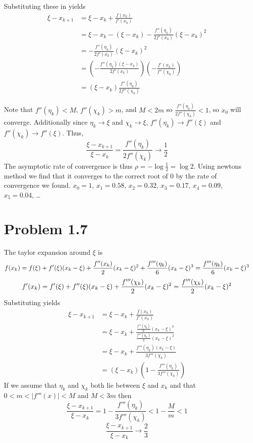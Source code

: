 \documentclass{article}
\begin{document}
Substituting these in yields
\begin{align*}
	\xi - x_{k+1} &= \xi - x_k + \frac{f(x_k)}{f'(x_k)} \\
	&= \xi - x_k - (\xi-x_k)  - \frac{f''(\eta_k)}{2f'(x_k)}(\xi-x_k)^2 \\
	&= -\frac{f''(\eta_k)}{2f'(x_k)}(\xi-x_k)^2 \\
	&=  \left(-\frac{f''(\eta_k)(\xi-x_k)}{2f'(x_k)}\right)\left(-\frac{f'(x_k)}{f''(\chi_k)}\right)\\
	&= (\xi-x_k)\frac{f''(\eta_k)}{2f''(\chi_k)}
\end{align*}

Note that $f''(\eta_k) < M$, $f''(\chi_k) > m$, and $M < 2m$ so $\frac{f''(\eta_k)}{2f''(\chi_k)} < 1$,
so $x_0$ will converge.
Additionally since $\eta_k \to \xi$ and $\chi_k \to \xi$,
$f''(\eta_k) \to f''(\xi)$ and $f''(\chi_k) \to f''(\xi)$.
Thus,
\[
	\frac{\xi - x_{k+1}}{\xi - x_k} = \frac{f''(\eta_k)}{2f''(\chi_k)} \to \frac{1}{2}
\]
The asymptotic rate of convergence is thus $\rho = -\log \frac{1}{2} = \log 2$.
Using newtons method we find that it converges to the correct root of 0 by the rate of convergence we found.
$x_0 = 1$, $x_1 = 0.58$, $x_2 = 0.32$, $x_3 = 0.17$, $x_4 = 0.09$, $x_5 = 0.04$, \dots
\newpage 

\section*{Problem 1.7}

The taylor expansion around $\xi$ is 
\[
	f(x_k) = f(\xi) + f'(\xi)(x_k-\xi) + \frac{f''(x_k)}{2}(x_k-\xi)^2 + \frac{f'''(\eta_k)}{6}(x_k-\xi)^3 = \frac{f'''(\eta_k)}{6}(x_k-\xi)^3\\
\]
\[
	f'(x_k) = f'(\xi) + f''(\xi)(x_k-\xi) + \frac{f'''(\chi_k)}{2}(x_k-\xi)^2 = \frac{f'''(\chi_k)}{2}(x_k-\xi)^2\\
\]
Substituting yields 
\begin{align*}
	\xi - x_{k+1} &= \xi - x_k + \frac{f(x_k)}{f'(x_k)} \\
	&= \xi - x_k + \frac{\frac{f'''(\eta_k)}{6}(x_k-\xi)^3}{\frac{f'''(\chi_k)}{2}(x_k-\xi)^2} \\
	&= \xi - x_k  + \frac{f'''(\eta_k)(x_k-\xi)}{3f'''(\chi_k)} \\
	&= (\xi - x_k) \left(1 - \frac{f'''(\eta_k)}{3f'''(\chi_k)}\right)
\end{align*}
If we assume that $\eta_k$ and $\chi_k$ both lie between $\xi$ and $x_k$ and that 
$0 < m < |f'''(x)| < M$ and $M < 3m$ then 
\[
	\frac{\xi - x_{k+1}}{\xi - x_k} = 1 - \frac{f'''(\eta_k)}{3f'''(\chi_k)} < 1 - \frac{M}{m} < 1
\]
\[
	\frac{\xi - x_{k+1}}{\xi - x_k} \to \frac{2}{3}
\]
\newpage
\end{document}
